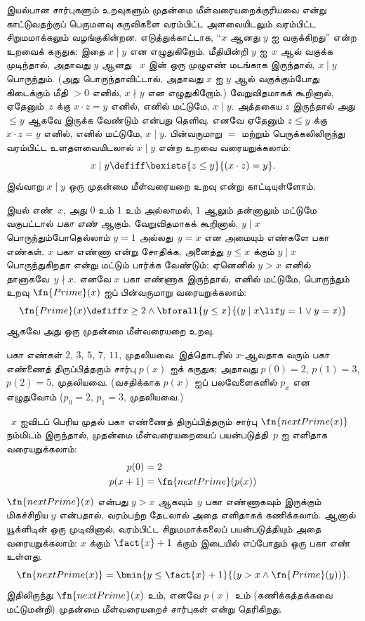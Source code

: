 \documentclass[../../../include/open-logic-section]{subfiles}
\begin{document}


இயல்பான சார்புகளும் உறவுகளும் முதன்மை மீள்வரையறைக்குரியவை என்று
காட்டுவதற்குப் பெருமளவு கருவிகளை வரம்பிட்ட அளவையிடலும் வரம்பிட்ட
சிறுமமாக்கலும் வழங்குகின்றன. எடுத்துக்காட்டாக, “$x$ ஆனது $y$ ஐ
வகுக்கிறது” என்ற உறவைக் கருதுக; இதை $x \mid y$ என எழுதுகிறோம்.
மீதியின்றி $y$ ஐ~$x$ ஆல் வகுக்க முடிந்தால், அதாவது $y$ ஆனது
~$x$ இன் ஒரு முழுஎண் மடங்காக இருந்தால், $x \mid y$ பொருந்தும்.
(அது பொருந்தாவிட்டால், அதாவது $x$ ஐ $y$ ஆல் வகுக்கும்போது கிடைக்கும்
மீதி $> 0$ எனில், $x \nmid y$ என எழுதுகிறோம்.) வேறுவிதமாகக்
கூறினால், ஏதேனும்~$z$ க்கு $x \cdot z = y$ எனில், எனில் மட்டுமே,
$x \mid y$. அத்தகைய $z$ இருந்தால் அது $\leq y$ ஆகவே இருக்க வேண்டும்
என்பது தெளிவு. எனவே ஏதேனும் $z \le y$ க்கு $x \cdot z = y$ எனில்,
எனில் மட்டுமே, $x \mid y$. பின்வருமாறு $=$ மற்றும் பெருக்கலிலிருந்து
வரம்பிட்ட உளதளவையிடலால் $x \mid y$ என்ற உறவை வரையறுக்கலாம்:
\[
x \mid y \defiff \bexists{z \leq y}{(x \cdot z) = y}.
\]
இவ்வாறு $x \mid y$ ஒரு முதன்மை மீள்வரையறை உறவு என்று காட்டியுள்ளோம்.

இயல் எண்~$x$, அது $0$ உம் $1$ உம் அல்லாமல், $1$ ஆலும் தன்னாலும்
மட்டுமே வகுபட்டால் \emph{பகா எண்} ஆகும். வேறுவிதமாகக் கூறினால்,
$y \mid x$ பொருந்தும்போதெல்லாம் $y = 1$ அல்லது~$y=x$ என அமையும்
எண்களே பகா எண்கள். $x$ பகா எண்ணா என்று சோதிக்க, அனைத்து
$y \le x$ க்கும் $y \mid x$ பொருந்துகிறதா என்று மட்டும் பார்க்க
வேண்டும்; ஏனெனில் $y > x$ எனில் தானாகவே~$y \nmid x$.
எனவே $x$ பகா எண்ணாக இருந்தால், எனில் மட்டுமே, பொருந்தும் உறவு
$\fn{Prime}(x)$ ஐப் பின்வருமாறு வரையறுக்கலாம்:
\[
\fn{Prime}(x) \defiff x \geq 2 \land \bforall{y \leq x}{(y \mid x \lif y
  = 1 \lor y = x)}
\]
ஆகவே அது ஒரு முதன்மை மீள்வரையறை உறவு.

பகா எண்கள் $2$, $3$, $5$, $7$, $11$, முதலியவை. இத்தொடரில்
$x$-ஆவதாக வரும் பகா எண்ணைத் திருப்பித்தரும் சார்பு $p(x)$ ஐக்
கருதுக; அதாவது $p(0) = 2$, $p(1) = 3$, $p(2) = 5$, முதலியவை.
(வசதிக்காக $p(x)$ ஐப் பலவேளைகளில் $p_x$ என எழுதுவோம்
($p_0=2$, $p_1=3$, முதலியவை.)

~$x$ ஐவிடப் பெரிய முதல் பகா எண்ணைத் திருப்பித்தரும் சார்பு
$\fn{nextPrime(x)}$ நம்மிடம் இருந்தால், முதன்மை மீள்வரையறையைப்
பயன்படுத்தி~$p$ ஐ எளிதாக வரையறுக்கலாம்:
\begin{align*}
  p(0) & = 2\\
  p(x+1) & = \fn{nextPrime}(p(x))
\end{align*}
$\fn{nextPrime}(x)$ என்பது $y > x$ ஆகவும்~$y$ பகா எண்ணாகவும்
இருக்கும் மிகச்சிறிய $y$ என்பதால், வரம்பற்ற தேடலால் அதை எளிதாகக்
கணிக்கலாம். ஆனால் யூக்ளிடின் ஒரு முடிவினால், வரம்பிட்ட சிறுமமாக்கலைப்
பயன்படுத்தியும் அதை வரையறுக்கலாம்: $x$ க்கும் $\fact{x}+1$ க்கும்
இடையில் எப்போதும் ஒரு பகா எண் உள்ளது.
\[
  \fn{nextPrime(x)} =
  \bmin{y \leq \fact{x}+1}{(y > x \land \fn{Prime}(y))}.
\]
இதிலிருந்து $\fn{nextPrime}(x)$ உம், எனவே $p(x)$ உம்
(கணிக்கத்தக்கவை மட்டுமன்றி) முதன்மை மீள்வரையறைச் சார்புகள் என்று
தெரிகிறது.
\end{document}

